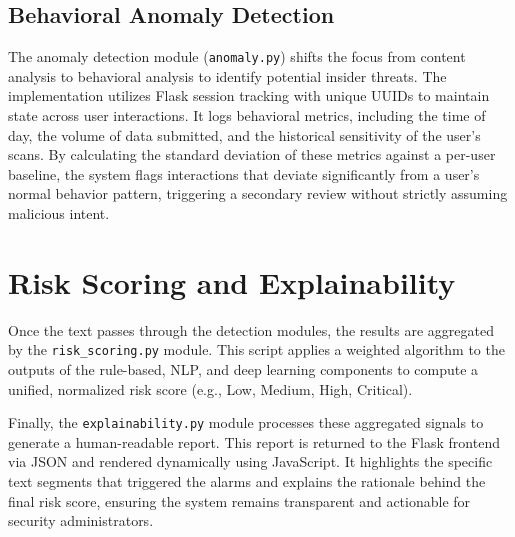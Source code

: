 \subsection{Behavioral Anomaly Detection}
\par The anomaly detection module (\texttt{anomaly.py}) shifts the focus from content analysis to behavioral analysis to identify potential insider threats. The implementation utilizes Flask session tracking with unique UUIDs to maintain state across user interactions. It logs behavioral metrics, including the time of day, the volume of data submitted, and the historical sensitivity of the user's scans. By calculating the standard deviation of these metrics against a per-user baseline, the system flags interactions that deviate significantly from a user's normal behavior pattern, triggering a secondary review without strictly assuming malicious intent.

\section{Risk Scoring and Explainability}
\par Once the text passes through the detection modules, the results are aggregated by the \texttt{risk\_scoring.py} module. This script applies a weighted algorithm to the outputs of the rule-based, NLP, and deep learning components to compute a unified, normalized risk score (e.g., Low, Medium, High, Critical). 

\par Finally, the \texttt{explainability.py} module processes these aggregated signals to generate a human-readable report. This report is returned to the Flask frontend via JSON and rendered dynamically using JavaScript. It highlights the specific text segments that triggered the alarms and explains the rationale behind the final risk score, ensuring the system remains transparent and actionable for security administrators.
